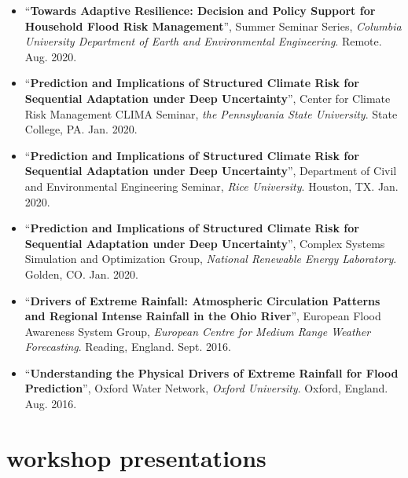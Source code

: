 \documentclass[11pt,article,oneside]{memoir}
\begin{document}
\mbox{}\vspace{-\dimexpr\baselineskip\relax}

\begin{itemize}[label={}]

  \item \enquote{\textbf{Towards Adaptive Resilience: Decision and Policy Support for Household Flood Risk Management}}, Summer Seminar Series,  \textit{Columbia University Department of Earth and Environmental Engineering}. Remote. Aug. 2020.

  \item \enquote{\textbf{Prediction and Implications of Structured Climate Risk for Sequential Adaptation under Deep Uncertainty}}, Center for Climate Risk Management CLIMA Seminar,  \textit{the Pennsylvania State University}. State College, PA. Jan. 2020.

  \item \enquote{\textbf{Prediction and Implications of Structured Climate Risk for Sequential Adaptation under Deep Uncertainty}}, Department of Civil and Environmental Engineering Seminar,  \textit{Rice University}. Houston, TX. Jan. 2020.

  \item \enquote{\textbf{Prediction and Implications of Structured Climate Risk for Sequential Adaptation under Deep Uncertainty}}, Complex Systems Simulation and Optimization Group,  \textit{National Renewable Energy Laboratory}. Golden, CO. Jan. 2020.

  \item \enquote{\textbf{Drivers of Extreme Rainfall: Atmospheric Circulation Patterns and Regional Intense Rainfall in the Ohio River}}, European Flood Awareness System Group,  \textit{European Centre for Medium Range Weather Forecasting}. Reading, England. Sept. 2016.

  \item \enquote{\textbf{Understanding the Physical Drivers of Extreme Rainfall for Flood Prediction}}, Oxford Water Network,  \textit{Oxford University}. Oxford, England. Aug. 2016.

\end{itemize}


\section{workshop presentations}

\mbox{}\vspace{-\dimexpr\baselineskip\relax}
\end{document}
